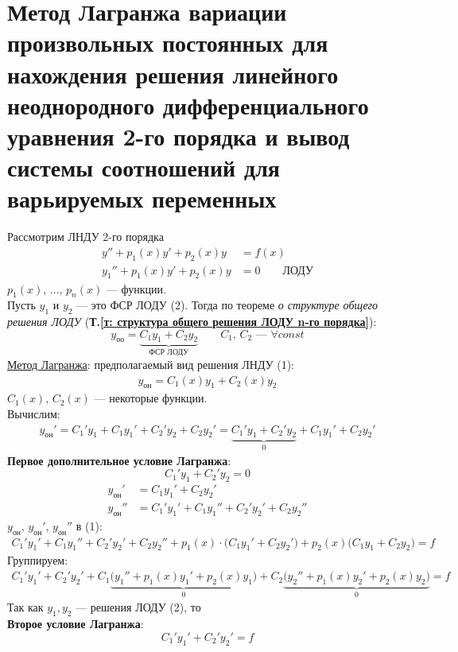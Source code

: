 \section{Метод Лагранжа вариации произвольных постоянных для нахождения решения линейного неоднородного дифференциального уравнения 2-го порядка и вывод системы соотношений для варьируемых переменных}
\setcounter{equation}{0}
Рассмотрим ЛНДУ 2-го порядка
\begin{align}
    y'' + p_1(x)y' + p_2(x)y &= f(x) \\
    y_1'' + p_1(x)y' + p_2(x)y &= 0\qquad \text{ЛОДУ}
\end{align}
$p_1(x),\, \ldots,\, p_n(x)$ --- функции.\\
Пусть $y_1$ и $y_2$ --- это ФСР ЛОДУ (2). Тогда по теореме \textit{о структуре общего решения ЛОДУ} (\textbf{Т.\ref{т: структура общего решения ЛОДУ n-го порядка}}):
\[
    y_\text{оо} = \underbrace{C_1y_1 + C_2y_2}_{\text{ФСР ЛОДУ}}\qquad C_1,\, C_2 \text{ --- } \forall const
\]
\underline{Метод Лагранжа}: предполагаемый вид решения ЛНДУ (1):
\begin{gather}
    y_{\text{он}} = C_1(x)y_1 + C_2(x)y_2
\end{gather}
$C_1(x),\, C_2(x)$ --- некоторые функции. \\
Вычислим:
\begin{align*}
    y_{\text{он}}' = C_1'y_1 + C_1y_1' + C_2'y_2 + C_2y_2' = \underbrace{C_1'y_1 + C_2'y_2}_0 + C_1y_1' + C_2y_2'
\end{align*}
\textbf{Первое дополнительное условие Лагранжа}:
\[
    \boxed{C_1'y_1 + C_2'y_2 = 0}
\]
\begin{align*}
    y_{\text{он}}' &= C_1y_1' + C_2y_2' \\
    y_{\text{он}}'' &= C_1'y_1' + C_1y_1'' + C_2'y_2' + C_2y_2''
\end{align*}
$y_{\text{он}},\, y_{\text{он}}',\, y_{\text{он}}''$ в (1):
\begin{align*}
    C_1'y_1' + C_1y_1'' + C_2'y_2' + C_2y_2'' + p_1(x) \cdot \big(C_1y_1' + C_2y_2'\big) + p_2(x) \big(C_1y_1 + C_2y_2\big) = f
\end{align*}
Группируем:
\begin{align*}
    C_1'y_1' + C_2'y_2' + C_1 \underbrace{\Big(y_1'' + p_1(x)y_1' + p_2(x)y_1\Big)}_0 + C_2 \underbrace{\Big(y_2'' + p_1(x)y_2' + p_2(x)y_2\Big)}_0 = f
\end{align*}
Так как $y_1,y_2$ --- решения ЛОДУ (2), то\\
\textbf{Второе условие Лагранжа}:
\[
    \boxed{C_1'y_1' + C_2'y_2' = f}
\]
